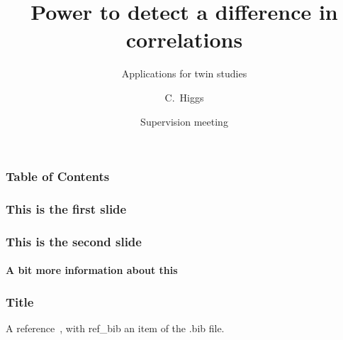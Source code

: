 \documentclass{beamer}
\title{Power to detect a difference in correlations}
\subtitle{Applications for twin studies}
\author{C.~Higgs\inst{1}}
\institute[Affiliation] %
{
  \inst{1}%
  Centre for Epidemiology and Biostatistics\\
  School of Population and Global Health\\
  University of Melbourne
}
\date[March 2018] %
{Supervision meeting}
\begin{document}
  \frame{\titlepage}
  
  \begin{frame}
    \frametitle{Table of Contents}
    \tableofcontents[currentsection]
  \end{frame}
  
  \AtBeginSection[]
  \begin{frame}
    \frametitle{This is the first slide}
    
   
  \end{frame}
  
  \AtBeginSection[]
  \begin{frame}
    \frametitle{This is the second slide}
    \framesubtitle{A bit more information about this}
  \end{frame}

  \begin{frame}
    \frametitle{Title}
     A reference~, with ref_bib an item of the .bib file.
  \end{frame}
  
\end{document}
